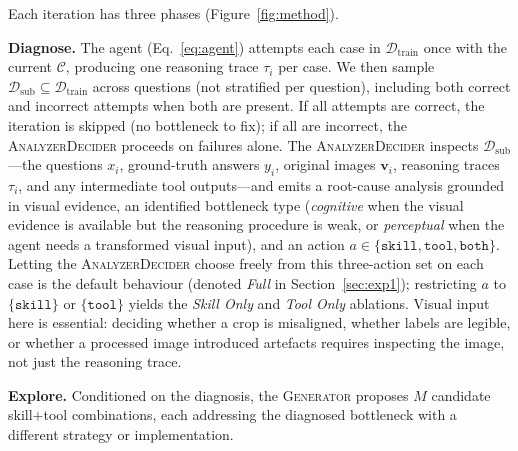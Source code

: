 Each iteration has three
phases (Figure~\ref{fig:method}).

\textbf{Diagnose.}
The agent (Eq.~\ref{eq:agent}) attempts each case in $\mathcal{D}_{\text{train}}$ once with
the current $\mathcal{C}$, producing one reasoning trace $\tau_i$ per case. We then sample
$\mathcal{D}_{\text{sub}} \subseteq \mathcal{D}_{\text{train}}$ across questions (not
stratified per question), including both correct and incorrect attempts when both are
present. If all attempts are correct, the iteration is skipped (no bottleneck to fix); if
all are incorrect, the \textsc{AnalyzerDecider} proceeds on failures alone. The \textsc{AnalyzerDecider} inspects
$\mathcal{D}_{\text{sub}}$---the questions $x_i$, ground-truth answers $y_i$, original
images $\mathbf{v}_i$, reasoning traces $\tau_i$, and any intermediate tool outputs---and
emits a root-cause analysis grounded in visual evidence, an identified bottleneck type (\emph{cognitive} when the visual evidence
is available but the reasoning procedure is weak, or \emph{perceptual} when the agent needs a
transformed visual input), and an action $a \in \{\texttt{skill}, \texttt{tool}, \texttt{both}\}$.
Letting the \textsc{AnalyzerDecider} choose freely from this three-action set on each
case is the default \sysname{} behaviour (denoted \emph{Full} in
Section~\ref{sec:exp1}); restricting $a$ to $\{\texttt{skill}\}$ or $\{\texttt{tool}\}$
yields the \emph{Skill Only} and \emph{Tool Only} ablations.
Visual input here is essential: deciding whether a crop is misaligned, whether labels are
legible, or whether a processed image introduced artefacts requires inspecting the image, not
just the reasoning trace.

\textbf{Explore.}
Conditioned on the diagnosis, the \textsc{Generator} proposes $M$ candidate skill$+$tool
combinations, each addressing the diagnosed bottleneck with a different strategy or
implementation.

